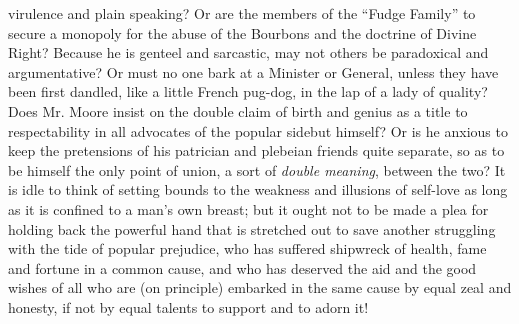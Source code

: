 virulence and plain speaking? Or are the members of the ``Fudge Family''
to secure a monopoly for the abuse of the Bourbons and the doctrine of
Divine Right? Because he is genteel and sarcastic, may not others be
paradoxical and argumentative? Or must no one bark at a Minister or
General, unless they have been first dandled, like a little French
pug-dog, in the lap of a lady of quality? Does Mr. Moore insist on the
double claim of birth and genius as a title to respectability in all
advocates of the popular side\textemdash but himself? Or is he anxious to keep the
pretensions of his patrician and plebeian friends quite separate, so
as to be himself the only point of union, a sort of \emph{double meaning},
between the two? It is idle to think of setting bounds to the weakness
and illusions of self-love as long as it is confined to a man's own
breast; but it ought not to be made a plea for holding back the powerful
hand that is stretched out to save another struggling with the tide
of popular prejudice, who has suffered shipwreck of health, fame and
fortune in a common cause, and who has deserved the aid and the good
wishes of all who are (on principle) embarked in the same cause by equal
zeal and honesty, if not by equal talents to support and to adorn it!

